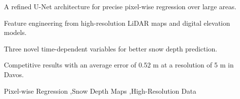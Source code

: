 \documentclass[preprint,12pt]{elsarticle}
\begin{document}
\begin{frontmatter}
\begin{abstract}
Accurate snow depth prediction is essential for hydrological risk assessment, flood prediction, water resource management, and weather forecasting. While previous studies have successfully applied deep learning techniques to generate snow depth maps, many have been constrained by geographical coverage or low data resolution. This work addresses these limitations by integrating high-resolution LiDAR maps, satellite imagery, digital elevation models, and three novel time-dependent variables. Additionally, the well-known U-Net architecture has been customized to perform pixel-wise regression and accurately predict snow depth over large geographic areas. The proposed method, called MAPunet, effectively models snow depth in the mountainous region of Davos, achieving an average error of 0.62 m at a 5 m resolution. The experimental results demonstrate the potential of combining high-resolution data with advanced deep learning techniques for enhanced snow depth mapping.
\end{abstract}


\begin{highlights}
\item A refined U-Net architecture for precise pixel-wise regression over large areas.
\item Feature engineering from high-resolution LiDAR maps and digital elevation models.
\item Three novel time-dependent variables for better snow depth prediction.
\item Competitive results with an average error of 0.52 m at a resolution of 5 m in Davos.
\end{highlights}

\begin{keyword}
Pixel-wise Regression \sep Snow Depth Maps \sep High-Resolution Data


\end{keyword}

\end{frontmatter}
\end{document}
